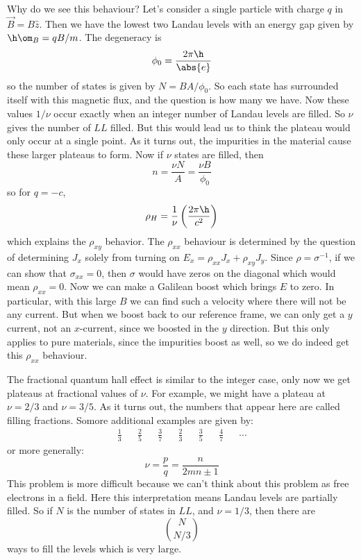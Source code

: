\documentclass{booc}
\begin{document}
Why do we see this behaviour?
Let's consider a single particle with charge $q$ in $\vec{B} = B \hat z$. 
Then we have the lowest two Landau levels
with an energy gap given by $\h \om_B = qB / m$.
The degeneracy is 
\begin{equation}
\phi_0 = \frac{2\pi \h}{\abs{e}}
\end{equation}
so the number of states is given by $N= BA / \phi_0$. 
So each state has surrounded itself with this magnetic flux, 
and the question is how many we have. 
Now these values $1/\nu$ occur exactly when an integer number of Landau levels are filled.
So $\nu$ gives the number of $LL$ filled.
But this would lead us to think the plateau would only occur at a single point. 
As it turns out, the impurities in the material cause these larger plateaus to form.
Now if $\nu$ states are filled, then 
\begin{equation}
n = \frac{\nu N }{A} = 
\frac{\nu B}{\phi_0}
\end{equation}
so for $q = -c$, 
\begin{equation}
\rho_H = \frac{1}{\nu} \left( \frac{2\pi \h}{c^2} \right)
\end{equation}
which explains the $\rho_{xy}$ behavior. 
The $\rho_{xx}$ behaviour is determined by the question of determining $J_x$ solely from turning on
$E_{x} =\rho_{xx}J_x + \rho_{xy} J_y$.
Since $\rho = \sigma^{-1}$, if we can show that
$\sigma_{xx} = 0$, then $\sigma$ would have zeros on the diagonal which would mean
$\rho_{xx} = 0$.
Now we can make a Galilean boost which brings $E$ to zero.
In particular, with this large $B$ we can find such a velocity
where there will not be any current. 
But when we boost back to our reference frame, we can 
only get a $y$ current, not an $x$-current, since we boosted in the $y$ direction.
But this only applies to pure materials, since the impurities boost as well, so we do
indeed get this $\rho_{xx}$ behaviour.

The fractional quantum hall effect is similar to the integer case, only now we
get plateaus at fractional values of $\nu$.
For example, we might have a plateau
at $\nu = 2/3$ and $\nu = 3/5$.
As it turns out, the numbers that appear here are called
filling fractions. Somore additional examples are given by:
\begin{align}
\frac{1}{3} &&
\frac{2}{5} &&
\frac{3}{7} &&
\frac{2}{3} &&
\frac{3}{5} &&
\frac{4}{7} &&
\cdots
\end{align}
or more generally:
\begin{equation}
\nu = \frac{p}{q} = \frac{n}{2mn \pm 1}
\end{equation}
This problem is more difficult because we can't think about
this problem as free electrons in a field. 
Here this interpretation means Landau levels are partially filled. 
So if $N$ is the number of states in $LL$,
and $\nu = 1/3$, then there are 
\begin{equation}
\binom{N}{N/3}
\end{equation}
ways to fill the levels
which is very large. 
\end{document}
